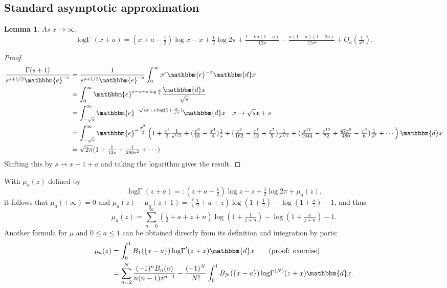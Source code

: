 \documentclass[12pt]{article}
\newcommand{\logG} {\operatorname {log \Gamma}}
\newcommand{\ee}[0] {\mathbbm{e}}
\newcommand{\dd}[0] {\mathbbm{d}}
\numberwithin{equation}{section}
\newtheorem{lemma}[theorem]{Lemma}
\begin{document}
\subsection{Standard asymptotic approximation}
\begin{lemma}
\label{lemma_gamma_asymp1}
As $x \to \infty$,
\begin{equation*}
\logG (x + a) = (x+a-\tfrac{1}{2}) \log x - x + \tfrac{1}{2} \log 2\pi + \tfrac{1-6a(1-a)}{12x} - \tfrac{a(1-a)(1-2a)}{12x^2} + O_a(\tfrac{1}{x^3}).
\end{equation*}
\end{lemma}
\begin{proof}
\begin{align*}
\frac{\Gamma(s+1)}{s^{s+1/2} \ee^{-s}} &= \frac{1}{{s^{s+1/2} \ee^{-s}}} \int_{0}^{\infty} x^s \ee^{-x} \dd x \\
&= \int_{0}^{\infty} \ee^{s-x+s\log \frac{x}{s}} \frac{\dd x}{\sqrt{s}} \\
&= \int_{-\sqrt{s}}^{\infty} \ee^{-\sqrt{s} x+s\log( 1+\frac{x}{\sqrt{s}})} \dd x \quad x \to \sqrt{s}x+s\\
&=\int_{-\sqrt{s}}^{\infty} \ee^{-\tfrac{x^2}{2}} \left(1+\tfrac{x^3}{3} \tfrac{1}{s^{1/2}}+(\tfrac{x^6}{18}-\tfrac{x^4}{4})\tfrac{1}{s}+(\tfrac{x^9}{162}-\tfrac{x^7}{12}+\tfrac{x^5}{5})\tfrac{1}{s^{3/2}} + (\tfrac{x^{12}}{1944}-\tfrac{x^{10}}{72}+\tfrac{47 x^8}{480}-\tfrac{x^6}{6}) \tfrac{1}{s^2} + \cdots\right) \dd x\\
&= \sqrt{2\pi} ( 1 + \tfrac{1}{12s} + \tfrac{1}{288s^2} + \cdots )
\end{align*}
Shifting this by $s \to x-1+a$ and taking the logarithm gives the result.
\end{proof}

With $\mu_a(z)$ defined by
\begin{equation*}
\logG(z + a) =: (z+a-\tfrac{1}{2}) \log z - z + \tfrac{1}{2} \log 2\pi + \mu_a(z).
\end{equation*}
it follows that $\mu_a(+\infty) = 0$ and $\mu_a(z)-\mu_a(z+1) = (\tfrac{1}{2}+a+z) \log(1+\frac{1}{z}) - \log(1+\frac{a}{z}) - 1$, and thus
\begin{equation*}
\mu_a(z) = \sum_{n=0}^{\infty} (\tfrac{1}{2}+a+z+n) \log(1+\tfrac{1}{z+n}) - \log(1+\tfrac{a}{z+n}) - 1\text{.}
\end{equation*}
Another formula for $\mu$ and $0 \le a \le 1$ can be obtained directly from its definition and integration by parts:
\begin{align*}
\mu_a (z) &= \int_{0}^{1} B_1(\{x-a\}) \logG'(z+x)\dd x \quad \quad 
\text{(proof: exercise)}\\
&= \sum_{n=2}^{N} \frac{(-1)^n B_n(a)}{n(n-1) z^{n-1}} - \frac{(-1)^N}{N!} \int_{0}^{1} B_{N}(\{x-a\}) \logG^{(N)}(z+x)\dd x \text{.}
\end{align*}
\end{document}
